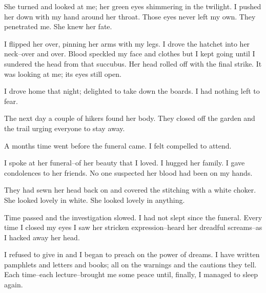 \documentclass{article}
\begin{document}
She turned and looked at me; her green eyes shimmering in the twilight.
I pushed her down with my hand around her throat.
Those eyes never left my own. They penetrated me.
She knew her fate.


I flipped her over, pinning her arms with my legs.
I drove the hatchet into her neck--over and over.
Blood speckled my face and clothes but I kept going
until I sundered the head from that succubus.
Her head rolled off with the final strike.
It was looking at me; its eyes still open.


I drove home that night;
delighted to take down the boards.
I had nothing left to fear.
\VV


\noindent
The next day a couple of hikers found her body.
They closed off the garden and the trail
urging everyone to stay away.


A months time went before the funeral came.
I felt compelled to attend.


I spoke at her funeral--of her beauty that I loved.
I hugged her family.
I gave condolences to her friends.
No one suspected her blood had been on my hands.


They had sewn her head back on and covered the
stitching with a white choker.
She looked lovely in white.
She looked lovely in anything.
\VV


\noindent
Time passed and the investigation slowed.
I had not slept since the funeral.
Every time I closed my eyes I saw her stricken expression--heard
her dreadful screams--as I hacked away her head.


I refused to give in and I began to preach on the power of dreams.
I have written pamphlets and letters and books;
all on the warnings and the cautions they tell.
Each time--each lecture--brought me some peace
until, finally, I managed to sleep again.
\VV


\noindent




\end{document}
